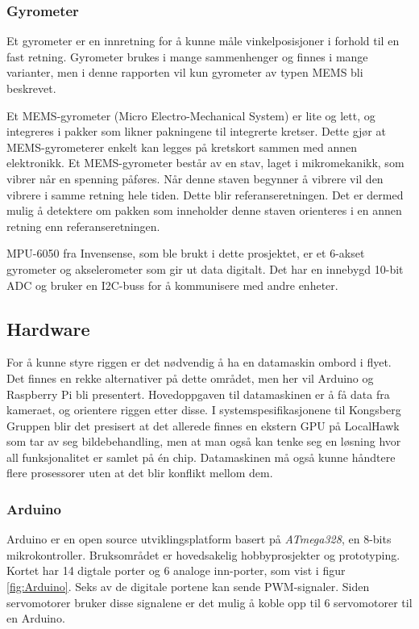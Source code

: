 \subsubsection{Gyrometer}

Et gyrometer er en innretning for å kunne måle vinkelposisjoner i forhold til en fast retning. Gyrometer brukes i mange sammenhenger og finnes i mange varianter, men i denne rapporten vil kun gyrometer av typen MEMS bli beskrevet. 

Et MEMS-gyrometer (Micro Electro-Mechanical System) er lite og lett, og integreres i pakker som likner pakningene til integrerte kretser. Dette gjør at MEMS-gyrometerer enkelt kan legges på kretskort sammen med annen elektronikk. Et MEMS-gyrometer består av en stav, laget i mikromekanikk, som vibrer når en spenning påføres. Når denne staven begynner å vibrere vil den vibrere i samme retning hele tiden. Dette blir referanseretningen. Det er dermed mulig å detektere om pakken som inneholder denne staven orienteres i en annen retning enn referanseretningen.

MPU-6050 fra Invensense, som ble brukt i dette prosjektet, er et 6-akset gyrometer og akselerometer som gir ut data digitalt. Det har en innebygd 10-bit ADC og bruker en I2C-buss for å kommunisere med andre enheter.\cite{InSens}

\subsection{Hardware}
For å kunne styre riggen er det nødvendig å ha en datamaskin ombord i flyet. Det finnes en rekke alternativer på dette området, men her vil Arduino og Raspberry Pi bli presentert. Hovedoppgaven til datamaskinen er å få data fra kameraet, og orientere riggen etter disse. I systemspesifikasjonene til Kongsberg Gruppen blir det presisert at det allerede finnes en ekstern GPU på LocalHawk som tar av seg bildebehandling, men at man også kan tenke seg en løsning hvor all funksjonalitet er samlet på én chip. Datamaskinen må også kunne håndtere flere prosessorer uten at det blir konflikt mellom dem.

\subsubsection{Arduino}
Arduino er en open source utviklingsplatform basert på \textit{ATmega328}, en 8-bits mikrokontroller. Bruksområdet er hovedsakelig hobbyprosjekter og prototyping. Kortet har 14 digtale porter og 6 analoge inn-porter, som vist i figur \ref{fig:Arduino}. Seks av de digitale portene kan sende PWM-signaler. Siden servomotorer bruker disse signalene er det mulig å koble opp til 6 servomotorer til en Arduino. 

